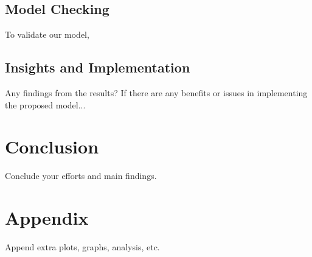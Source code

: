 \documentclass[10pt, letterpaper] {article}
\begin{document}
\subsection{Model Checking}
To validate our model,

\subsection{Insights and Implementation}
Any findings from the results? If there are any benefits or issues in implementing the proposed model...
\section{Conclusion}
Conclude your efforts and main findings.

\section{Appendix}
Append extra plots, graphs, analysis, etc. \cite{Williamson2001}

 

\end{document}
